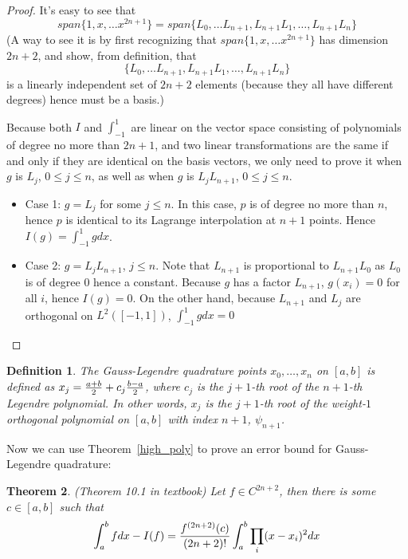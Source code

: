 \documentclass[20pt]{article} %
\theoremstyle{break}
\newtheorem{definition}{Definition}[section]
\newtheorem{thm}[definition]{Theorem}
\begin{document}
  \begin{proof}
  It's easy to see that
  \[span\{1, x, \dots x^{2n+1}\}=span\{L_0, \dots L_{n+1}, L_{n+1}L_1, \dots, L_{n+1}L_n\}\]
  (A way to see it is by first recognizing that $span\{1, x, \dots x^{2n+1}\}$ has dimension $2n+2$, and show, from definition, that
  \[\{L_0, \dots L_{n+1}, L_{n+1}L_1, \dots, L_{n+1}L_n\}\]
  is a linearly independent set of $2n+2$ elements (because they all have different degrees) hence must be a basis.)

  \newpage

  Because both $I$ and $\int_{-1}^1$ are linear on the vector space consisting of polynomials of degree no more than $2n+1$, and two linear transformations are the same if and only if they are identical on the basis vectors, we only need to prove it when $g$ is $L_j$, $0\leq j\leq n$, as well as when $g$ is $L_jL_{n+1}$, $0\leq j\leq n$.
  \begin{itemize}
  \item Case 1: $g=L_j$ for some $j\leq n$. In this case, $p$ is of degree no more than $n$, hence $p$ is identical to its Lagrange interpolation at $n+1$ points. Hence $I(g)=\int_{-1}^1gdx$.
   \item Case 2: $g=L_jL_{n+1}$, $j\leq n$. Note that $L_{n+1}$ is proportional to $L_{n+1}L_0$ as $L_0$ is of degree $0$ hence a constant. Because $g$ has a factor $L_{n+1}$, $g(x_i)=0$ for all $i$, hence $I(g)=0$. On the other hand, because $L_ {n+1}$ and $L_j$ are orthogonal on $L^2([-1, 1])$, $\int_{-1}^1gdx=0$
  \end{itemize}
  \end{proof}

\newpage
  
  \begin{definition}
  The Gauss-Legendre quadrature points $x_0,\dots, x_n$ on $[a, b]$ is defined as $x_j={a+b\over 2}+c_j{b-a\over 2}$, where $c_j$ is the $j+1$-th root of the $n+1$-th Legendre polynomial. In other words, $x_j$ is the $j+1$-th root of the weight-$1$ orthogonal polynomial on $[a, b]$ with index $n+1$, $\psi_{n+1}$.
\end{definition}

  Now we can use Theorem~\ref{high_poly} to prove an error bound for Gauss-Legendre quadrature:
  \begin{thm}(Theorem 10.1 in textbook)
    Let $f\in C^{2n+2}$, then there is some $c\in [a,  b]$ such that
    \[\int_a^bfdx-I(f)={f^{(2n+2)}(c)\over (2n+2)!}\int_a^b\prod_i(x-x_i)^2 dx\]
  \end{thm}
\end{document}
